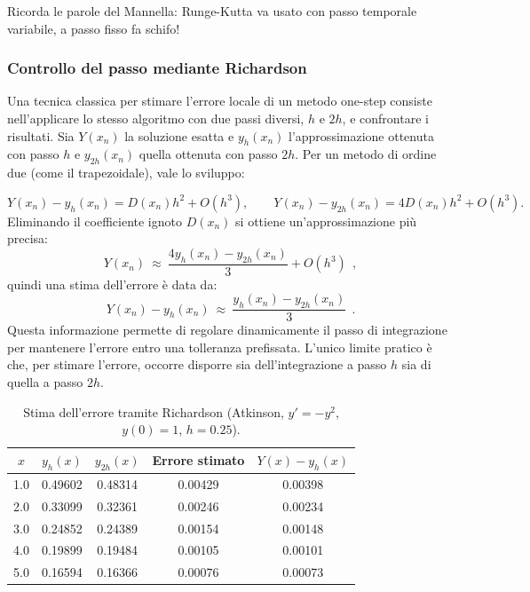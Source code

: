 \begin{dimostrazione}{}
	Ricorda le parole del Mannella: Runge-Kutta va usato con passo temporale variabile, a passo fisso fa schifo!
\end{dimostrazione}


\subsubsection{Controllo del passo mediante Richardson}

Una tecnica classica per stimare l'errore locale di un metodo one-step consiste
nell'applicare lo stesso algoritmo con due passi diversi, $h$ e $2h$, e
confrontare i risultati.  
Sia $Y(x_n)$ la soluzione esatta e $y_h(x_n)$ l'approssimazione ottenuta con passo $h$ e $y_{2h}(x_n)$ quella
ottenuta con passo $2h$.  
Per un metodo di ordine due (come il trapezoidale), vale lo sviluppo:

\[
Y(x_n) - y_h(x_n) = D(x_n) h^2 + O(h^3),
\qquad
Y(x_n) - y_{2h}(x_n) = 4 D(x_n) h^2 + O(h^3).
\]
Eliminando il coefficiente ignoto $D(x_n)$ si ottiene un'approssimazione più precisa:
\[
Y(x_n)\ \approx \ \frac{4 y_h(x_n) - y_{2h}(x_n)}{3} + O(h^3)\ \ ,
\]
quindi una stima dell'errore è data da:
\[
Y(x_n) - y_h(x_n)\  \approx \ 
\frac{y_h(x_n) - y_{2h}(x_n)}{3} \ \ .
\]
Questa informazione permette di regolare dinamicamente il passo di integrazione
per mantenere l'errore entro una tolleranza prefissata. 
L'unico limite pratico è che, per stimare l'errore, occorre disporre sia
dell'integrazione a passo $h$ sia di quella a passo $2h$.

\begin{table}[H]
	\centering
	\begin{tabular}{c|c|c|c|c}
		\hline
		$x$ & $y_h(x)$ & $y_{2h}(x)$ & Errore stimato & $Y(x)-y_h(x)$ \\
		\hline
		1.0 & 0.49602 & 0.48314 & 0.00429 & 0.00398 \\
		2.0 & 0.33099 & 0.32361 & 0.00246 & 0.00234 \\
		3.0 & 0.24852 & 0.24389 & 0.00154 & 0.00148 \\
		4.0 & 0.19899 & 0.19484 & 0.00105 & 0.00101 \\
		5.0 & 0.16594 & 0.16366 & 0.00076 & 0.00073 \\
		\hline
	\end{tabular}
	\caption{Stima dell'errore tramite Richardson (Atkinson, $y'=-y^2$, $y(0)=1$, $h=0.25$).}
\end{table}



